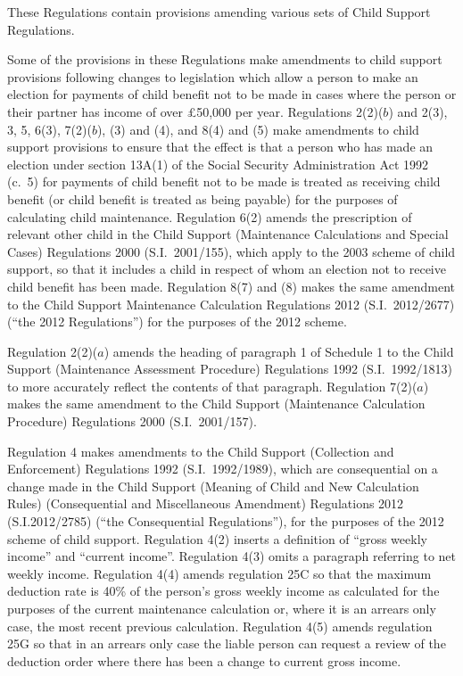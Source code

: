 \documentclass[12pt,a4paper]{article}
\begin{document}
These Regulations contain provisions amending various sets of Child Support Regulations.

Some of the provisions in these Regulations make amendments to child support provisions following changes to legislation which allow a person to make an election for payments of child benefit not to be made in cases where the person or their partner has income of over £50,000 per year. Regulations 2(2)($b$)  and 2(3), 3, 5, 6(3), 7(2)($b$), (3) and (4), and 8(4) and (5) make amendments to child support provisions to ensure that the effect is that a person who has made an election under section 13A(1) of the Social Security Administration Act 1992 (c.~5) for payments of child benefit not to be made is treated as receiving child benefit (or child benefit is treated as being payable) for the purposes of calculating child maintenance. Regulation 6(2) amends the prescription of relevant other child in the Child Support (Maintenance Calculations and Special Cases) Regulations 2000 (S.I.~2001/155), which apply to the 2003 scheme of child support, so that it includes a child in respect of whom an election not to receive child benefit has been made. Regulation 8(7) and (8) makes the same amendment to the Child Support Maintenance Calculation Regulations 2012 (S.I.~2012/2677) (“the 2012 Regulations”) for the purposes of the 2012 scheme.

Regulation 2(2)($a$)  amends the heading of paragraph 1 of Schedule 1 to the Child Support (Maintenance Assessment Procedure) Regulations 1992 (S.I.~1992/1813) to more accurately reflect the contents of that paragraph. Regulation 7(2)($a$)  makes the same amendment to the Child Support (Maintenance Calculation Procedure) Regulations 2000 (S.I.~2001/157).

Regulation 4 makes amendments to the Child Support (Collection and Enforcement) Regulations 1992 (S.I.~1992/1989), which are consequential on a change made in the Child Support (Meaning of Child and New Calculation Rules) (Consequential and Miscellaneous Amendment) Regulations 2012 (S.I.2012/2785) (“the Consequential Regulations”), for the purposes of the 2012 scheme of child support. Regulation 4(2) inserts a definition of “gross weekly income” and “current income”. Regulation 4(3) omits a paragraph referring to net weekly income. Regulation 4(4) amends regulation 25C so that the maximum deduction rate is 40\% of the person’s gross weekly income as calculated for the purposes of the current maintenance calculation or, where it is an arrears only case, the most recent previous calculation. Regulation 4(5) amends regulation 25G so that in an arrears only case the liable person can request a review of the deduction order where there has been a change to current gross income.
\end{document}
